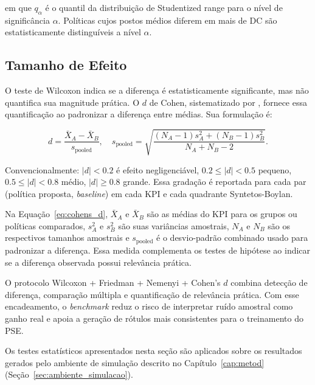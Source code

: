 \noindent em que $q_\alpha$ é o quantil da distribuição de Studentized range para o nível de significância $\alpha$. Políticas cujos postos médios diferem em mais de DC são estatisticamente distinguíveis a nível $\alpha$.

\subsection{Tamanho de Efeito}

O teste de Wilcoxon indica se a diferença é estatisticamente significante, mas não quantifica sua magnitude prática. O $d$ de Cohen, sistematizado por \citet{Cohen1988StatisticalPower}, fornece essa quantificação ao padronizar a diferença entre médias. Sua formulação é:

\begin{equation}
  d = \frac{\bar{X}_A - \bar{X}_B}{s_{\text{pooled}}}, \quad s_{\text{pooled}} = \sqrt{\frac{(N_A-1)s_A^2 + (N_B-1)s_B^2}{N_A+N_B-2}}.
  \label{eq:cohens_d}
\end{equation}

Convencionalmente: $|d| < 0.2$ é efeito negligenciável, $0.2 \leq |d| < 0.5$ pequeno, $0.5 \leq |d| < 0.8$ médio, $|d| \geq 0.8$ grande. Essa gradação é reportada para cada par (política proposta, \textit{baseline}) em cada KPI e cada quadrante Syntetos-Boylan.

Na Equação~\ref{eq:cohens_d}, $\bar{X}_A$ e $\bar{X}_B$ são as médias do KPI para os grupos ou políticas comparados, $s_A^2$ e $s_B^2$ são suas variâncias amostrais, $N_A$ e $N_B$ são os respectivos tamanhos amostrais e $s_{\text{pooled}}$ é o desvio-padrão combinado usado para padronizar a diferença. Essa medida complementa os testes de hipótese ao indicar se a diferença observada possui relevância prática.

\smallskip
O protocolo Wilcoxon + Friedman + Nemenyi + Cohen's $d$ combina detecção de diferença, comparação múltipla e quantificação de relevância prática. Com esse encadeamento, o \textit{benchmark} reduz o risco de interpretar ruído amostral como ganho real e apoia a geração de rótulos mais consistentes para o treinamento do PSE.

\noindent Os testes estatísticos apresentados nesta seção são aplicados sobre os resultados gerados pelo ambiente de simulação descrito no Capítulo~\ref{cap:metod} (Seção~\ref{sec:ambiente_simulacao}).
